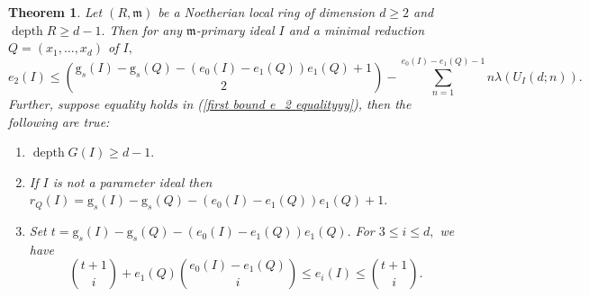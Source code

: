 \documentclass[reqno,a4paper,dvipsnames]{amsart}
\newcommand{\m}{\mathfrak{m} }
\newcommand{\depth}{\operatorname{depth}}
\newtheorem{theorem}{Theorem}[section]
\theoremstyle{definition}
\begin{document}
\begin{theorem} \label{finalupperbounde2}
    Let $(R,\m)$ be a Noetherian local ring of dimension $d\geq 2$ and  $\depth R \geq d-1.$  Then  for any $\m$-primary ideal  $I$   and a  minimal reduction $Q=(x_1,\ldots,x_{d})$ of $I,$ 
     \begin{equation} \label{first bound e_2 equalityyy}
         e_2(I) \leq \displaystyle\binom{\mathrm{g}_s(I) - \mathrm{g}_s(Q) - (e_{0}(I)-e_{1}(Q))e_1(Q) + 1}{2}-\displaystyle \sum_{n=1}^{e_{0}(I)-e_{1}(Q)-1}
           n\lambda(U_{I}(d;n)).
     \end{equation}
 Further, suppose equality holds in  (\ref{first bound e_2 equalityyy}), then the following are true: 
 \begin{enumerate}[\normalfont(i)]
     \item \label{depthh1}   $\depth G(I) \geq d-1.$
     \item  \label{depthh2}  If $I$ is not a parameter ideal  then 
          $r_{Q}(I)=\mathrm{g}_s(I) - \mathrm{g}_s(Q) - (e_{0}(I)-e_{1}(Q))e_1(Q)+1.$
          \item \label{depthh3} Set $t=\mathrm{g}_{s}(I)-\mathrm{g}_s(Q) - (e_{0}(I)-e_{1}(Q))e_1(Q).$ For $3 \leq i \leq d,$ we have 
   \[\displaystyle\binom{t + 1}{i}+e_{1}(Q)\binom{e_{0}(I)-e_{1}(Q)}{i} \leq e_{i}(I) \leq\displaystyle\binom{t + 1}{i}.\]
 \end{enumerate}
  
\end{theorem}
\end{document}
